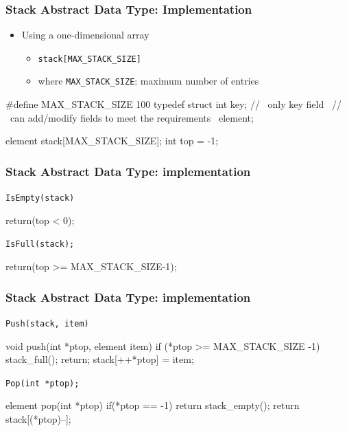\documentclass[newPxFont,sthlmFooter,nooffset]{beamer}
\begin{document}
\begin{frame}[t, fragile]
  \frametitle{Stack Abstract Data Type: Implementation}
  \begin{itemize}
  \item Using a one-dimensional array
    \begin{itemize}
    \item \texttt{stack[MAX\_STACK\_SIZE]}
    \item where \texttt{MAX\_STACK\_SIZE}: maximum number of entries
    \end{itemize}
  \end{itemize}
\begin{ncodedef}
#define MAX_STACK_SIZE  100
typedef struct {
    int key; // ~only key field~
             // ~can add/modify fields to meet the requirements~
} element;

element stack[MAX_STACK_SIZE];
int top = -1;
\end{ncodedef}
\end{frame}


\begin{frame}[t, fragile]
  \frametitle{Stack Abstract Data Type: implementation}
\texttt{IsEmpty(stack)}
  \begin{codedef}
    return(top < 0);
  \end{codedef}

\texttt{IsFull(stack);}

  \begin{codedef}
    return(top >= MAX_STACK_SIZE-1);
  \end{codedef}

\end{frame}


\begin{frame}[t, fragile]
  \frametitle{Stack Abstract Data Type: implementation}
\texttt{Push(stack, item)}

  \begin{codedef}
void push(int *ptop, element item){
    if (*ptop >= MAX_STACK_SIZE -1) {
       stack_full();
       return;
    }
    stack[++*ptop] = item;    
}
  \end{codedef}


\texttt{Pop(int *ptop);}

  \begin{codedef}
element pop(int *ptop){
    if(*ptop == -1)
        return stack_empty();
    return stack[(*ptop)--];
}
  \end{codedef}

\end{frame}
\end{document}
